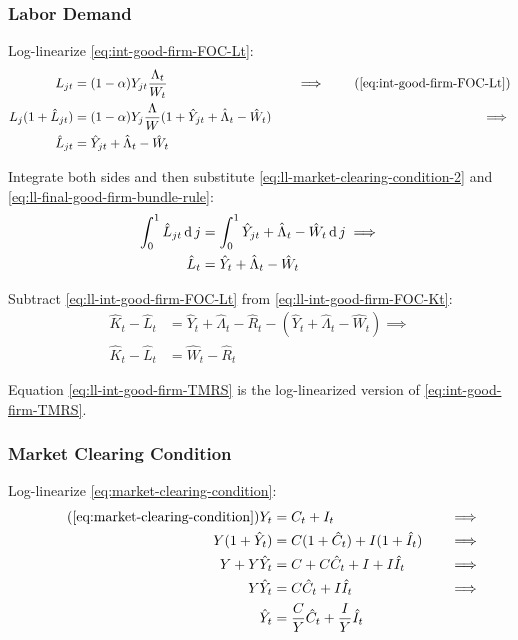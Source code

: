\documentclass[
thesis.tex
]{subfiles}
\begin{document}
	
	\subsubsection*{Labor Demand}
	
	Log-linearize \ref{eq:int-good-firm-FOC-Lt}:
	\begin{alignat}{2}
		L_{jt} &= (1-\alpha) Y_{jt} \frac{\Lambda_t}{W_t} &\implies \tag{\ref{eq:int-good-firm-FOC-Lt}} \\
		L_j (1+ \hat{L}_{jt}) &= (1-\alpha) Y_{j} \frac{\Lambda}{W} (1+ \hat{Y}_{jt} +\hat{\Lambda}_t -\hat{W}_t) \quad &\implies \nonumber \\
		\hat{L}_{jt} &= \hat{Y}_{jt} +\hat{\Lambda}_t -\hat{W}_t \nonumber
	\end{alignat}
	
	Integrate both sides and then substitute \ref{eq:ll-market-clearing-condition-2} and \ref{eq:ll-final-good-firm-bundle-rule}:
	\begin{align}
		\int_{0}^{1} \hat{L}_{jt} \operatorname{d} j &= \int_{0}^{1} \hat{Y}_{jt} + \hat{\Lambda}_t - \hat{W}_t \operatorname{d} j \implies \nonumber \\
		\hat{L}_t &= \hat{Y}_t + \hat{\Lambda}_t - \hat{W}_t
		\label{eq:ll-int-good-firm-FOC-Lt}
	\end{align}
	
	Subtract \ref{eq:ll-int-good-firm-FOC-Lt} from \ref{eq:ll-int-good-firm-FOC-Kt}:
	\begin{align}
		\hat{K}_t - \hat{L}_t &= \hat{Y}_t + \hat{\Lambda}_t - \hat{R}_t - (\hat{Y}_t + \hat{\Lambda}_t - \hat{W}_t) \implies \nonumber \\
		\hat{K}_t - \hat{L}_t &= \hat{W}_t - \hat{R}_t \label{eq:ll-int-good-firm-TMRS}
	\end{align}
	
	Equation \ref{eq:ll-int-good-firm-TMRS} is the log-linearized version of \ref{eq:int-good-firm-TMRS}.
	
	
	\subsubsection*{Market Clearing Condition}
	
	Log-linearize \ref{eq:market-clearing-condition}:
	\begin{alignat}{2}
		\tag{\ref{eq:market-clearing-condition}}
		Y_t &= C_t + I_t &\implies \\
		Y (1+ \hat{Y}_t) &= C(1+ \hat{C}_t) + I (1+ \hat{I}_t) \quad &\implies \nonumber \\
		Y + Y\hat{Y}_t &= C + C\hat{C}_t + I + I\hat{I}_t &\implies \nonumber  \\
		Y\hat{Y}_t &= C\hat{C}_t + I\hat{I}_t &\implies \nonumber \\
		\hat{Y}_t &= \frac{C}{Y}\hat{C}_t + \frac{I}{Y}\hat{I}_t  \label{eq:ll-market-clearing-condition}
	\end{alignat}
	
\end{document}
